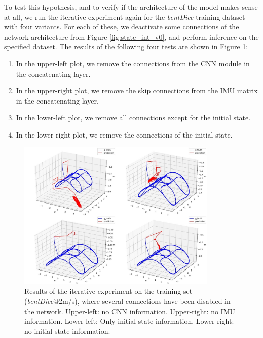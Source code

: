 To test this hypothesis, and to verify if the architecture of the model makes sense at all, we run the iterative experiment again for the \emph{bentDice} training dataset with four variants. For each of these, we deactivate some connections of the network architecture from Figure \ref{fig:state_int_v0}, and perform inference on the specified dataset. The results of the following four tests are shown in Figure \ref{fig:iterative_bentDice_contributions}:
\begin{enumerate}
    \item\label{item:iterative_no_CNN} In the upper-left plot, we remove the connections from the CNN module in the concatenating layer.
    \item\label{item:iterative_no_IMU_skip} In the upper-right plot, we remove the skip connections from the IMU matrix in the concatenating layer.
    \item\label{item:iterative_just_state_0} In the lower-left plot, we remove all connections except for the initial state.
    \item\label{item:iterative_just_imu_data} In the lower-right plot, we remove the connections of the initial state.
\end{enumerate}

\begin{figure}[h]
   \centering
   \includegraphics[width=0.85\textwidth]{thesis_template/img/iterative_bentDice_contributions.jpg}
   \caption{Results of the iterative experiment on the training set (\emph{bentDice}@2m/s), where several connections have been disabled in the network. Upper-left: no CNN information. Upper-right: no IMU information. Lower-left: Only initial state information. Lower-right: no initial state information.}
   \label{fig:iterative_bentDice_contributions}
\end{figure}

